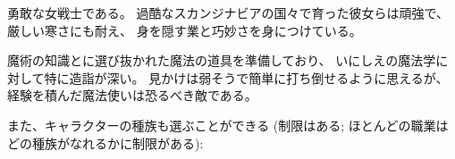 \item[\bb{ワルキューレ(Valkyrie)}]%
勇敢な女戦士である。
過酷なスカンジナビアの国々で育った彼女らは頑強で、厳しい寒さにも耐え、
身を隠す業と巧妙さを身につけている。
\item[\bb{魔法使い(Wizard)}]%
魔術の知識とに選び抜かれた魔法の道具を準備しており、
いにしえの魔法学に対して特に造詣が深い。
見かけは弱そうで簡単に打ち倒せるように思えるが、
経験を積んだ魔法使いは恐るべき敵である。
\elist

また、キャラクターの種族も選ぶことができる
(制限はある; ほとんどの職業はどの種族がなれるかに制限がある):

